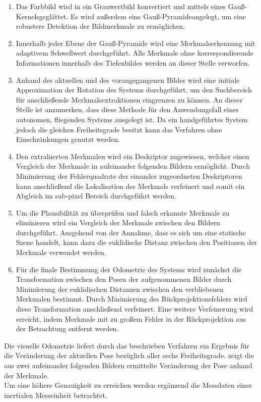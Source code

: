\begin{enumerate}
\item Das Farbbild wird in ein Grauwertbild konvertiert und mittels eines Gauß-Kernels\red[erklären?] geglättet. Es wird außerdem eine Gauß-Pyramide angelegt, um eine robustere Detektion der Bildmerkmale zu ermöglichen.
\item Innerhalb jeder Ebene der Gauß-Pyramide wird eine Merkmalserkennung mit adaptivem Schwellwert durchgeführt. Alle Merkmale ohne korrespondierende Informationen innerhalb des Tiefenbildes werden an dieser Stelle verworfen.
\item Anhand des aktuellen und des vorangegangenen Bildes wird eine initiale Approximation der Rotation des Systems durchgeführt, um den Suchbereich für anschließende Merkmalsextraktionen eingrenzen zu können. An dieser Stelle ist anzumerken, dass diese Methode für den Anwendungsfall eines autonomen, fliegenden Systems ausgelegt ist. Da ein handgeführtes System jedoch die gleichen Freiheitsgrade besitzt kann das Verfahren ohne Einschränkungen genutzt werden.
\item Den extrahierten Merkmalen wird ein Deskriptor zugewiesen, welcher einen Vergleich der Merkmale in aufeinander folgenden Bildern ermöglicht. Durch Minimierung der Fehlerquadrate der einander zugeordneten Deskriptoren kann anschließend die Lokalisation des Merkmals verfeinert und somit ein Abgleich im sub-pixel Bereich durchgeführt werden.
\item Um die Plausibilität zu überprüfen und falsch erkannte Merkmale zu eliminieren wird ein Vergleich der Merkmale zwischen den Bildern durchgeführt. Ausgehend von der Annahme, dass es sich um eine statische Szene handelt, kann dazu die euklidische Distanz zwischen den Positionen der Merkmale verwendet werden.
\item Für die finale Bestimmung der Odometrie des Systems wird zunächst die Transformation zwischen den Posen der aufgenommenen Bilder durch Minimierung der euklidischen Distanzen zwischen den verbliebenen Merkmalen bestimmt. Durch Minimierung des Rückprojektionsfehlers wird diese Transformation anschließend verfeinert. Eine weitere Verfeinerung wird erreicht, indem Merkmale mit zu großem Fehler in der Rückprojektion aus der Betrachtung entfernt werden.
\end{enumerate}
Die visuelle Odometrie liefert durch das beschrieben Verfahren ein Ergebnis für die Veränderung der aktuellen Pose bezüglich aller sechs Freiheitsgrade.  \red[(c)] zeigt die aus zwei aufeinander folgenden Bildern ermittelte Veränderung der Pose anhand der Merkmale.\\
Um eine höhere Genauigkeit zu erreichen werden ergänzend die Messdaten einer inertialen Messeinheit betrachtet.

